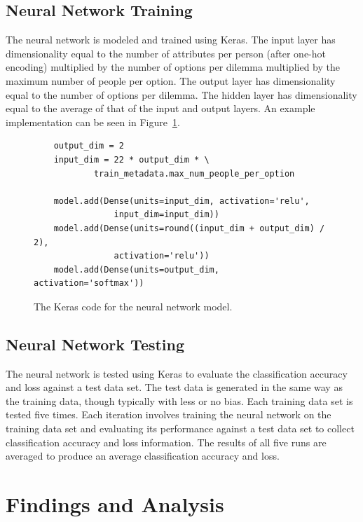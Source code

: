 \documentclass{report}
\begin{document}
\section{Neural Network Training}

The neural network is modeled and trained using Keras. The input layer has dimensionality equal to
the number of attributes per person (after one-hot encoding) multiplied by the number of options per
dilemma multiplied by the maximum number of people per option. The output layer has dimensionality
equal to the number of options per dilemma. The hidden layer has dimensionality equal to the average
of that of the input and output layers. An example implementation can be seen in
Figure~\ref{fig:code_for_keras_model}.

\begin{figure}
    \centering
    \begin{verbatim}
    output_dim = 2
    input_dim = 22 * output_dim * \
            train_metadata.max_num_people_per_option

    model.add(Dense(units=input_dim, activation='relu',
                input_dim=input_dim))
    model.add(Dense(units=round((input_dim + output_dim) / 2),
                activation='relu'))
    model.add(Dense(units=output_dim, activation='softmax'))
    \end{verbatim}
    \caption{The Keras code for the neural network model.}
    \label{fig:code_for_keras_model}
\end{figure}

\section{Neural Network Testing}

The neural network is tested using Keras to evaluate the classification accuracy and loss against a
test data set. The test data is generated in the same way as the training data, though typically
with less or no bias. Each training data set is tested five times. Each iteration involves training
the neural network on the training data set and evaluating its performance against a test data set
to collect classification accuracy and loss information. The results of all five runs are averaged
to produce an average classification accuracy and loss.

\chapter{Findings and Analysis}
\end{document}
